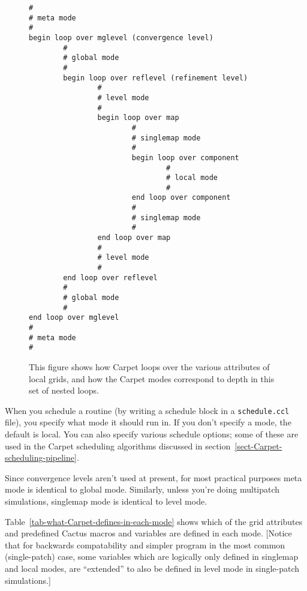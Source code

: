 \documentclass{article}
\begin{document}
\begin{figure}[bp]
\begin{verbatim}
#
# meta mode
#
begin loop over mglevel (convergence level)
        #
        # global mode
        #
        begin loop over reflevel (refinement level)
                #
                # level mode
                #
                begin loop over map
                        #
                        # singlemap mode
                        #
                        begin loop over component
                                #
                                # local mode
                                #
                        end loop over component
                        #
                        # singlemap mode
                        #
                end loop over map
                #
                # level mode
                #
        end loop over reflevel
        #
        # global mode
        #
end loop over mglevel
#
# meta mode
#
\end{verbatim}
\caption[Carpet Loops and Modes]
	{
	This figure shows how Carpet loops over the various
	attributes of local grids, and how the Carpet modes
	correspond to depth in this set of nested loops.
	}
\label{fig-Carpet-loops-and-modes}
\end{figure}

When you schedule a routine (by writing a schedule block in a
\verb|schedule.ccl| file), you specify what mode it should run in.
If you don't specify a mode, the default is local.  You can also
specify various schedule options; some of these are used in the
Carpet scheduling algorithms discussed in
section~\ref{sect-Carpet-scheduling-pipeline}.

Since convergence levels aren't used at present, for most practical
purposes meta mode is identical to global mode.  Similarly, unless
you're doing multipatch simulations, singlemap mode is identical to
level mode.

Table~\ref{tab-what-Carpet-defines-in-each-mode} shows which of the
grid attributes and predefined Cactus macros and variables are defined
in each mode.  [Notice that for backwards compatability and simpler
program in the most common (single-patch) case, some variables which
are logically only defined in singlemap and local modes, are ``extended''
to also be defined in level mode in single-patch simulations.]
\end{document}
